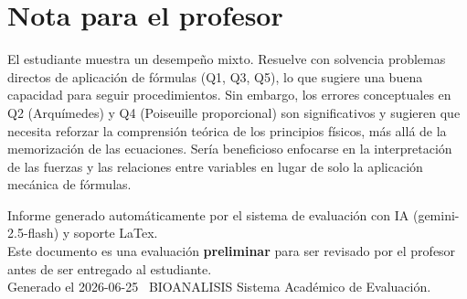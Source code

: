 \documentclass[11pt,a4paper]{article}
\begin{document}
\section*{Nota para el profesor}
\begin{tcolorbox}[
  enhanced, breakable,
  colback=yellow!8, colframe=yellow!60!black,
  fonttitle=\bfseries, coltitle=black,
  title={Observaciones para revisión manual},
  top=4pt, bottom=4pt, left=8pt, right=8pt,
]
El estudiante muestra un desempeño mixto. Resuelve con solvencia problemas directos de aplicación de fórmulas (Q1, Q3, Q5), lo que sugiere una buena capacidad para seguir procedimientos. Sin embargo, los errores conceptuales en Q2 (Arquímedes) y Q4 (Poiseuille proporcional) son significativos y sugieren que necesita reforzar la comprensión teórica de los principios físicos, más allá de la memorización de las ecuaciones. Sería beneficioso enfocarse en la interpretación de las fuerzas y las relaciones entre variables en lugar de solo la aplicación mecánica de fórmulas.
\end{tcolorbox}

\vspace{12pt}
\begin{center}
  \footnotesize\color{gray}
  Informe generado automáticamente por el sistema de evaluación con IA (gemini-2.5-flash) y soporte LaTex. \\
  Este documento es una evaluación \textbf{preliminar} para ser revisado por el profesor antes de ser entregado al 
  estudiante. \\
  Generado el 2026-06-25 \textbullet\ BIOANALISIS Sistema Académico de Evaluación.
  \end{center}
\end{document}
